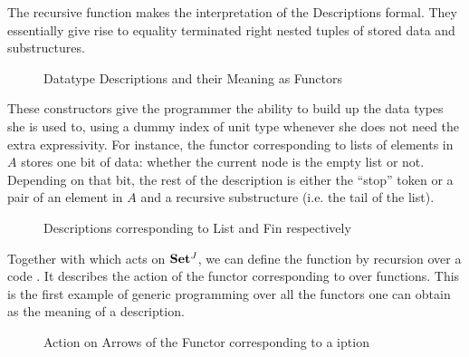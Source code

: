 The recursive function  makes the interpretation of the
Descriptions formal. They essentially give rise to equality
terminated right nested tuples of stored data and substructures.

\begin{figure}[h]
\hspace{-1em}\begin{minipage}{0.50\textwidth}
\end{minipage}\hspace{2em}
\begin{minipage}{0.40\textwidth}
\end{minipage}
\caption{Datatype Descriptions and their Meaning as Functors}\label{figure:desc}
\end{figure}

These constructors give the programmer the ability to build up the data
types she is used to, using a dummy index of unit type whenever she does
not need the extra expressivity. For instance, the functor corresponding
to lists of elements in $A$ stores one bit of data: whether the current
node is the empty list or not. Depending on that bit, the rest of the
description is either the ``stop'' token or a pair of an element in $A$
and a recursive substructure (i.e. the tail of the list).

\begin{figure}[h]
\begin{minipage}{0.45\textwidth}
\end{minipage}
\begin{minipage}{0.45\textwidth}
\end{minipage}
\caption{Descriptions corresponding to List and Fin respectively}\label{figure:listD}
\end{figure}

Together with  which acts on $\mathbf{Set}{}^J$, we can define the
function  by recursion over a code . It describes the
action of the functor corresponding to  over functions. This is
the first example of generic programming over all the functors one can
obtain as the meaning of a description.

\begin{figure}[h]
\caption{Action on Arrows of the Functor corresponding to a iption}
\end{figure}


